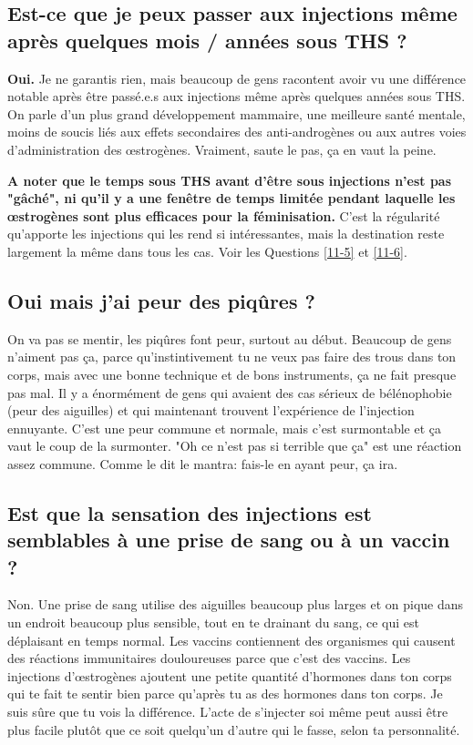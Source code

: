 \documentclass{article}
\begin{document}
\subsection{Est-ce que je peux passer aux injections même après quelques mois / années sous THS ?}

\textbf{Oui.} Je ne garantis rien, mais beaucoup de gens racontent avoir vu une différence notable après être passé.e.s aux injections même après quelques années sous THS. On parle d'un plus grand développement mammaire, une meilleure santé mentale, moins de soucis liés aux effets secondaires des anti-androgènes ou aux autres voies d'administration des œstrogènes. Vraiment, saute le pas, ça en vaut la peine.

\textbf{A noter que le temps sous THS avant d'être sous injections n'est pas "gâché", ni qu'il y a une fenêtre de temps limitée pendant laquelle les œstrogènes sont plus efficaces pour la féminisation.} C'est la régularité qu'apporte les injections qui les rend si intéressantes, mais la destination reste largement la même dans tous les cas. Voir les Questions \ref{11-5} et \ref{11-6}. 

\subsection{Oui mais j'ai peur des piqûres ?}

On va pas se mentir, les piqûres font peur, surtout au début. Beaucoup de gens n'aiment pas ça, parce qu'instintivement tu ne veux pas faire des trous dans ton corps, mais avec une bonne technique et de bons instruments, ça ne fait presque pas mal. Il y a énormément de gens qui avaient des cas sérieux de bélénophobie (peur des aiguilles) et qui maintenant trouvent l'expérience de l'injection ennuyante. C'est une peur commune et normale, mais c'est surmontable et ça vaut le coup de la surmonter. "Oh ce n'est pas si terrible que ça" est une réaction assez commune. Comme le dit le mantra: fais-le en ayant peur, ça ira. 

\subsection{Est que la sensation des injections est semblables à une prise de sang ou à un vaccin ?}

Non. Une prise de sang utilise des aiguilles beaucoup plus larges et on pique dans un endroit beaucoup plus sensible, tout en te drainant du sang, ce qui est déplaisant en temps normal. Les vaccins contiennent des organismes qui causent des réactions immunitaires douloureuses parce que c'est des vaccins. Les injections d'œstrogènes ajoutent une petite quantité d'hormones dans ton corps qui te fait te sentir bien parce qu'après tu as des hormones dans ton corps. Je suis sûre que tu vois la différence. L'acte de s'injecter soi même peut aussi être plus facile plutôt que ce soit quelqu'un d'autre qui le fasse, selon ta personnalité.
\end{document}
